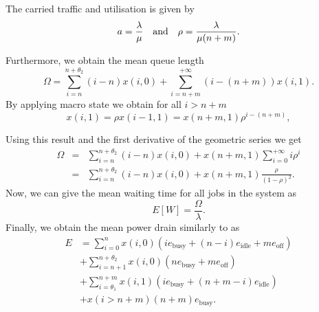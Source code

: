 The carried traffic and utilisation is given by
\begin{equation*}
a = \frac{\lambda}{\mu} \text{\quad and\quad} \rho=\frac{\lambda}{\mu(n+m)}.
\end{equation*}

Furthermore, we obtain the mean queue length
\begin{equation*}
\Omega = \sum_{i=n}^{n+\theta_2} (i-n)x(i,0) + \sum_{i=n+m}^{+\infty} (i-(n+m))x(i,1).
\end{equation*}
By applying macro state  we obtain for all \(i>n+m\)
\begin{equation}
x(i,1) = \rho x(i-1,1) = x(n + m,1)\rho^{i-(n+m)},
\label{eq:cloud:data_centers:modeling:x_i_redefinition}
\end{equation} 

Using this result and the first derivative of the geometric series we get 
\begin{eqnarray*}
\Omega &=& \sum_{i=n}^{n+\theta_2} (i-n)x(i,0) + x(n+m,1)\sum_{i=0}^{+\infty} i\rho^i\nonumber\\
&=& \sum_{i=n}^{n+\theta_2} (i-n)x(i,0) + x(n+m,1)\frac{\rho}{(1-\rho)^2}.
\end{eqnarray*}
Now, we can give the mean waiting time for all jobs in the system as
\begin{equation*}
E[W] = \frac{\Omega}{\lambda}.
\end{equation*}
Finally, we obtain the mean power drain similarly to  as
\begin{align*}
E& = \sum_{i=0}^{n} x(i,0)(i e_\text{busy} + (n-i)e_\text{idle} + m e_\text{off})\\
&+ \sum_{i=n+1}^{n+\theta_2} x(i,0)(ne_\text{busy}+me_\text{off})\nonumber\\
&+\sum_{i=\theta_1}^{n+m} x(i,1)(i e_\text{busy} + (n+m-i)e_\text{idle})\nonumber\\
&+x(i > n+m)(n+m)e_\text{busy}.\nonumber
\end{align*}
